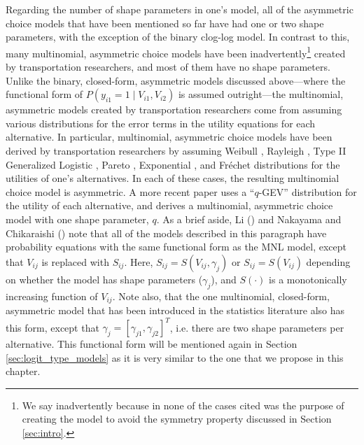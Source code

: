 Regarding the number of shape parameters in one's model, all of the asymmetric choice models that have been mentioned so far have had one or two shape parameters, with the exception of the binary clog-log model. In contrast to this, many multinomial, asymmetric choice models have been inadvertently\footnote{We say inadvertently because in none of the cases cited was the purpose of creating the model to avoid the symmetry property discussed in Section \ref{sec:intro}.} created by transportation researchers, and most of them have no shape parameters. Unlike the binary, closed-form, asymmetric models discussed above---where the functional form of $P \left( y_{i1} = 1 \mid V_{i1}, V_{i2} \right)$ is assumed outright---the multinomial, asymmetric models created by transportation researchers come from assuming various distributions for the error terms in the utility equations for each alternative. In particular, multinomial, asymmetric choice models have been derived by transportation researchers by assuming Weibull \citep{castillo_closed_2008, fosgerau_discrete_2009}, Rayleigh \citep{li_multinomial_2011}, Type II Generalized Logistic \citep{li_multinomial_2011}, Pareto \citep{li_multinomial_2011, mattsson_extreme_2014}, Exponential \citep{li_multinomial_2011}, and Fr{\'e}chet \citep{mattsson_extreme_2014} distributions for the utilities of one's alternatives. In each of these cases, the resulting multinomial choice model is asymmetric. A more recent paper \citep{nakayama_unified_2015} uses a ``$q$-GEV'' distribution for the utility of each alternative, and derives a multinomial, asymmetric choice model with one shape parameter, $q$. As a brief aside, Li (\citeyear{li_multinomial_2011}) and Nakayama and Chikaraishi (\citeyear{nakayama_unified_2015}) note that all of the models described in this paragraph have probability equations with the same functional form as the MNL model, except that $V_{ij}$ is replaced with $S_{ij}$. Here, $S_{ij} = S \left(V_{ij}, \gamma _j \right)$ or $S_{ij} = S \left(V_{ij} \right)$ depending on whether the model has shape parameters ($\gamma _j$), and $S \left( \cdot \right)$ is a monotonically increasing function of $V_{ij}$. Note also, that the one multinomial, closed-form, asymmetric model that has been introduced in the statistics literature \citep{das_generalized_2014} also has this form, except that $\gamma _j = \left[ \gamma_{j1}, \gamma_{j2} \right]^T$, i.e. there are two shape parameters per alternative. This functional form will be mentioned again in Section \ref{sec:logit_type_models} as it is very similar to the one that we propose in this chapter.

